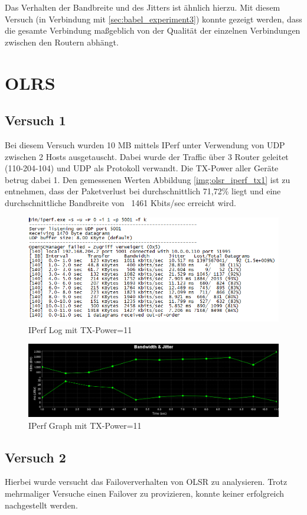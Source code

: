 \documentclass[10pt]{scrartcl}
\begin{document}
Das Verhalten der Bandbreite und des Jitters ist ähnlich hierzu.
Mit diesem Versuch (in Verbindung mit \ref{sec:babel_experiment3}) konnte gezeigt werden, dass die gesamte Verbindung maßgeblich von der Qualität der einzelnen Verbindungen zwischen den Routern abhängt.

\section{OLRS}
	\subsection{Versuch 1}
	Bei diesem Versuch wurden 10 MB mittels IPerf  unter Verwendung von UDP zwischen 2 Hosts ausgetauscht. Dabei wurde der Traffic über 3 Router geleitet (110-204-104) und UDP als Protokoll verwandt. Die TX-Power aller Geräte betrug dabei 1. 
Den gemessenen Werten Abbildung \ref{img:olsr_iperf_tx1} ist zu entnehmen, dass der Paketverlust bei durchschnittlich 71,72\% liegt und eine durchschnittliche Bandbreite von ~1461 Kbits/sec erreicht wird.


	\begin{figure}[H]
        \centering
                \includegraphics[width=\textwidth]{img/OLSR_TX1_Protokoll}
        \caption{IPerf Log mit TX-Power=11}
        \label{img:olsr_iperf_tx11}
	\end{figure}
	
	\begin{figure}[H]
        \centering
                \includegraphics[width=\textwidth]{img/3_UDP_OLSR_10MB}
        \caption{IPerf Graph mit TX-Power=11}
        \label{img:olsr_iperf_graph_tx11}
	\end{figure}
	
	\subsection{Versuch 2}
	Hierbei wurde versucht das Failoververhalten von OLSR zu analysieren. Trotz mehrmaliger Versuche einen Failover zu provizieren, konnte keiner erfolgreich nachgestellt werden.
\end{document}
